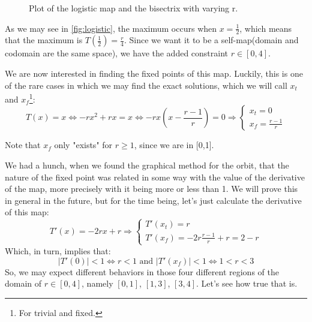 \begin{example}
\begin{figure}[ht]
        \caption{Plot of the logistic map and the bisectrix with varying r.}
        \label{fig:logistic}
    \end{figure}

    As we may see in \autoref{fig:logistic}, the maximum occurs when $x=\frac{1}{2}$, which means that the maximum is $T(\frac{1}{2})=\frac{r}{4}$. Since we want it to be a self-map(domain and codomain are the same space), we have the added constraint $r\in[0, 4]$. 

    We are now interested in finding the fixed points of this map. Luckily, this is one of the rare cases in which we may find the exact solutions, which we will call $x_t$ and $x_f$\footnote{For trivial and fixed.}:
    \begin{equation*}
        T(x)=x\Leftrightarrow -rx^2+rx=x\Leftrightarrow-rx\left(x-\frac{r-1}{r}\right)=0\Rightarrow\begin{cases}
            x_t=0 \\ x_f=\frac{r-1}{r}
        \end{cases}
    \end{equation*}

    Note that $x_f$ only "exists" for $r\geq1$, since we are in [0,1]. 
    
    We had a hunch, when we found the graphical method for the orbit, that the nature of the fixed point was related in some way with the value of the derivative of the map, more precisely with it being more or less than 1. We will prove this in general in the future, but for the time being, let's just calculate the derivative of this map:
    \begin{equation*}
        T'(x)=-2rx+r\Rightarrow\begin{cases}
            T'(x_t)=r \\
            T'(x_f)=-2r\frac{r-1}{r}+r=2-r
        \end{cases}
    \end{equation*}
    Which, in turn, implies that:
    \begin{equation*}
        |T'(0)|<1\Leftrightarrow r<1\text{ and }|T'(x_f)|<1\Leftrightarrow1<r<3
    \end{equation*} 
    So, we may expect different behaviors in those four different regions of the domain of $r\in[0,4]$, namely $[0,1]$, $[1,3]$, $[3, 4]$. Let's see how true that is.
    

\end{example}
